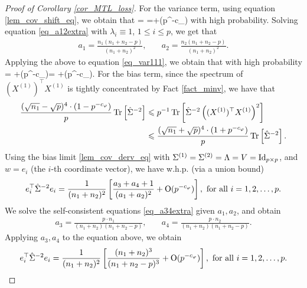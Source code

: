 \begin{proof}[Proof of Corollary \ref{cor_MTL_loss}]
For the variance term, using equation \eqref{lem_cov_shift_eq}, we obtain that
\be\label{eq_var111} = \tr{}=+\OO(p^{-c_\varphi})\ee
with high probability. Solving equation \eqref{eq_a12extra} with $\lambda_i\equiv 1$, $1\le i\le p$, we get that  
	\begin{align}
		 a_1 = \frac{n_1(n_1 + n_2 - p)}{(n_1 + n_2)^2} ,\quad
		& a_2 = \frac{n_2(n_1 + n_2 - p)}{(n_1 +n_2)^2} . \label{simplesovlea12}
			\end{align}
Applying the above to equation \eqref{eq_var111}, we obtain that with high probability
\be\label{eq_var112}  =  \cdot {}+\OO(p^{-c_\varphi})=  +\OO(p^{-c_\varphi}).\ee
For the bias term, since the spectrum of $(X^{(1)})^{\top} X^{(1)}$ is tightly concentrated by Fact \ref{fact_minv}, we have that
\begin{align}
 \frac{(\sqrt{n_1}-\sqrt{p})^4 \cdot (1- p^{-c_\varphi})}{p} \operatorname{Tr}\left[\hat \Sigma^{-2}\right]  &\leqslant {p}^{-1}\operatorname{Tr}\left[\hat\Sigma^{-2} \left((X^{(1)})^\top X^{(1)} \right)^2\right] \label{eq_bias111}\\
 &\leqslant \frac{(\sqrt{n_1}+\sqrt{p})^4 \cdot (1+ p^{-c_\varphi})}{p} \operatorname{Tr}\left[\hat\Sigma^{-2}\right].\nonumber
\end{align}
Using the bias limit \eqref{lem_cov_derv_eq} with $\Sigma^{(1)}=\Sigma^{(2)}=\Lambda=V=\operatorname{Id}_{p\times p}$, and $w = e_i$ (the $i$-th coordinate vector), we have w.h.p. (via a union bound)
\begin{align*}%
 e_i^{\top}\hat\Sigma^{-2} e_i = \frac{1}{(n_1+n_2)^2} \left[\frac{a_3+a_4+1}{(a_1+a_2)^2} +\OO(p^{-c_\varphi})\right], \text{ for all } i = 1, 2, \dots, p.
\end{align*}
We solve the self-consistent equations \eqref{eq_a34extra} given $a_1, a_2$, and obtain
\begin{align*}
		a_3 = \frac{p\cdot n_1}{(n_1 +n_2)(n_1 +n_2 - p)}, \quad
		&  a_4 = \frac{p\cdot n_2}{(n_1 + n_2)(n_1 + n_2 - p)}. %
\end{align*}
Applying $a_3, a_4$ to the equation above, we obtain
\begin{align*}%
 e_i^{\top}\hat\Sigma^{-2}e_i =  \frac{1}{(n_1+n_2)^2} \left[  \frac{ (n_1+n_2)^3 }{(n_1+n_2-p)^3} +\OO(p^{-c_\varphi})\right], \text{ for all } i = 1, 2, \dots, p.
\end{align*}

\end{proof}
